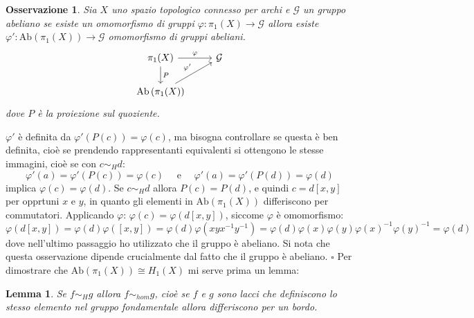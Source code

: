 \documentclass[10pt, twoside=false, x11names]{scrbook}
\newtheorem{lemma}[theorem]{Lemma}
\newtheorem{osservation}[theorem]{Osservazione}
\newenvironment{proof}{{\textbf{Dimostrazione}:}}{\hfill $\square$}
\newcommand{\Ab}[1]{\mathrm{Ab}\left( #1 \right)}
\let\phi\varphi
\begin{document}
\begin{osservation}
  Sia $ X $ uno spazio topologico connesso per archi e $ \mathcal{G} $ un gruppo abeliano se esiste un omomorfismo
  di gruppi $ \phi: \pi_1(X) \to \mathcal{G} $ allora esiste $ \phi' : \Ab{\pi_1(X)} \to \mathcal{G} $ omomorfismo di gruppi abeliani.
  \[
    \begin{tikzcd}
      \pi_1(X) \arrow{r}{\phi} \arrow{d}{P} & \mathcal{G} \\
      \Ab{\pi_1(X)} \arrow{ur}{\phi'}
    \end{tikzcd}
  \]
  dove $ P $ è la proiezione sul quoziente.
\end{osservation}
\begin{proof}
  $ \phi' $ è definita da $ \phi'(P(c)) = \phi(c) $, ma bisogna controllare
  se questa è ben definita, cioè se prendendo rappresentanti equivalenti
  si ottengono le stesse immagini, cioè se con $ c \sim_H d $:
  \[
    \phi'(a) = \phi'(P(c)) = \phi(c) \quad \text{ e } \quad \phi'(a) = \phi'(P(d)) = \phi(d)
  \]
  implica $ \phi(c) = \phi(d) $. Se $ c \sim_H d $ allora $ P(c) = P(d) $,
  e quindi $ c = d[x,y] $ per opprtuni $ x $ e $ y $,
  in quanto gli elementi in $ \Ab{\pi_1(X)} $
  differiscono per commutatori. Applicando $ \phi $: $ \phi(c) = \phi(d[x,y]) $,
  siccome $ \phi $ è omomorfismo:
  \[
    \phi(d[x,y]) = \phi(d)\phi([x,y]) = \phi(d) \phi(xyx^{-1}y^{-1}) = \phi(d) \phi(x) \phi(y) \phi(x)^{-1} \phi(y)^{-1} = \phi(d)
  \]
  dove nell'ultimo passaggio ho utilizzato che il gruppo è abeliano.
  Si nota che questa osservazione dipende crucialmente dal fatto che il gruppo è abeliano.
\end{proof}
\hfill\newline\newline
Per dimostrare che $ \Ab{\pi_1(X)} \cong H_1(X) $ mi serve prima un lemma:
\begin{lemma}
  Se $ f \sim_H g $ allora $ f \sim_{hom} g $, cioè se $ f $ e $ g $ sono lacci che definiscono
  lo stesso elemento nel gruppo fondamentale allora differiscono per un bordo.
\end{lemma}
\end{document}
